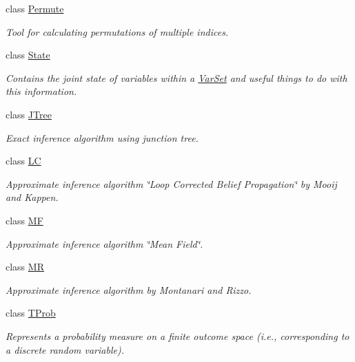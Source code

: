 \begin{CompactItemize}
class \hyperlink{classdai_1_1Permute}{Permute}
\begin{CompactList}\small\item\em Tool for calculating permutations of multiple indices. \item\end{CompactList}\item 
class \hyperlink{classdai_1_1State}{State}
\begin{CompactList}\small\item\em Contains the joint state of variables within a \hyperlink{classdai_1_1VarSet}{VarSet} and useful things to do with this information. \item\end{CompactList}\item 
class \hyperlink{classdai_1_1JTree}{JTree}
\begin{CompactList}\small\item\em Exact inference algorithm using junction tree. \item\end{CompactList}\item 
class \hyperlink{classdai_1_1LC}{LC}
\begin{CompactList}\small\item\em Approximate inference algorithm \char`\"{}Loop Corrected Belief Propagation\char`\"{} by Mooij and Kappen. \item\end{CompactList}\item 
class \hyperlink{classdai_1_1MF}{MF}
\begin{CompactList}\small\item\em Approximate inference algorithm \char`\"{}Mean Field\char`\"{}. \item\end{CompactList}\item 
class \hyperlink{classdai_1_1MR}{MR}
\begin{CompactList}\small\item\em Approximate inference algorithm by Montanari and Rizzo. \item\end{CompactList}\item 
class \hyperlink{classdai_1_1TProb}{TProb}
\begin{CompactList}\small\item\em Represents a probability measure on a finite outcome space (i.e., corresponding to a discrete random variable). \item\end{CompactList}\item 

\end{CompactItemize}
